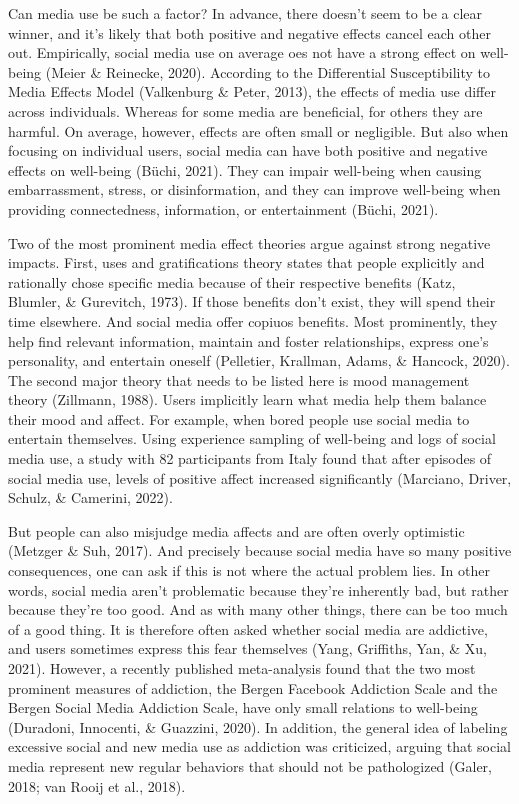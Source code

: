 \documentclass[
  man,mask]{apa6}
\begin{document}
Can media use be such a factor?
In advance, there doesn't seem to be a clear winner, and it's likely that both positive and negative effects cancel each other out.
Empirically, social media use on average oes not have a strong effect on well-being (Meier \& Reinecke, 2020).
According to the Differential Susceptibility to Media Effects Model (Valkenburg \& Peter, 2013), the effects of media use differ across individuals.
Whereas for some media are beneficial, for others they are harmful.
On average, however, effects are often small or negligible.
But also when focusing on individual users, social media can have both positive and negative effects on well-being (Büchi, 2021).
They can impair well-being when causing embarrassment, stress, or disinformation, and they can improve well-being when providing connectedness, information, or entertainment (Büchi, 2021).

Two of the most prominent media effect theories argue against strong negative impacts.
First, uses and gratifications theory states that people explicitly and rationally chose specific media because of their respective benefits (Katz, Blumler, \& Gurevitch, 1973).
If those benefits don't exist, they will spend their time elsewhere.
And social media offer copiuos benefits.
Most prominently, they help find relevant information, maintain and foster relationships, express one's personality, and entertain oneself (Pelletier, Krallman, Adams, \& Hancock, 2020).
The second major theory that needs to be listed here is mood management theory (Zillmann, 1988).
Users implicitly learn what media help them balance their mood and affect.
For example, when bored people use social media to entertain themselves.
Using experience sampling of well-being and logs of social media use, a study with 82 participants from Italy found that after episodes of social media use, levels of positive affect increased significantly (Marciano, Driver, Schulz, \& Camerini, 2022).

But people can also misjudge media affects and are often overly optimistic (Metzger \& Suh, 2017).
And precisely because social media have so many positive consequences, one can ask if this is not where the actual problem lies.
In other words, social media aren't problematic because they're inherently bad, but rather because they're too good.
And as with many other things, there can be too much of a good thing.
It is therefore often asked whether social media are addictive, and users sometimes express this fear themselves (Yang, Griffiths, Yan, \& Xu, 2021).
However, a recently published meta-analysis found that the two most prominent measures of addiction, the Bergen Facebook Addiction Scale and the Bergen Social Media Addiction Scale, have only small relations to well-being (Duradoni, Innocenti, \& Guazzini, 2020).
In addition, the general idea of labeling excessive social and new media use as addiction was criticized, arguing that social media represent new regular behaviors that should not be pathologized (Galer, 2018; van Rooij et al., 2018).
\end{document}
